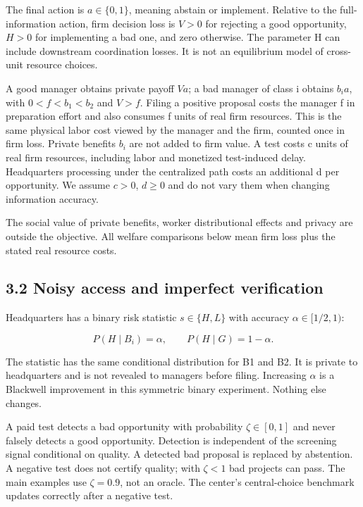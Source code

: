 \documentclass[
  11pt,
]{article}
\begin{document}
The final action is \(a\in\{0,1\}\), meaning abstain or implement.
Relative to the full-information action, firm decision loss is \(V>0\)
for rejecting a good opportunity, \(H>0\) for implementing a bad one,
and zero otherwise. The parameter H can include downstream coordination
losses. It is not an equilibrium model of cross-unit resource choices.

A good manager obtains private payoff \(Va\); a bad manager of class i
obtains \(b_i a\), with \(0<f<b_1<b_2\) and \(V>f\). Filing a positive
proposal costs the manager f in preparation effort and also consumes f
units of real firm resources. This is the same physical labor cost
viewed by the manager and the firm, counted once in firm loss. Private
benefits \(b_i\) are not added to firm value. A test costs c units of
real firm resources, including labor and monetized test-induced delay.
Headquarters processing under the centralized path costs an additional d
per opportunity. We assume \(c>0\), \(d\geq0\) and do not vary them when
changing information accuracy.

The social value of private benefits, worker distributional effects and
privacy are outside the objective. All welfare comparisons below mean
firm loss plus the stated real resource costs.

\subsection{3.2 Noisy access and imperfect
verification}\label{noisy-access-and-imperfect-verification}

Headquarters has a binary risk statistic \(s\in\{H,L\}\) with accuracy
\(\alpha\in[1/2,1)\):

\[P(H\mid B_i)=\alpha,\qquad P(H\mid G)=1-\alpha.\]

The statistic has the same conditional distribution for B1 and B2. It is
private to headquarters and is not revealed to managers before filing.
Increasing \(\alpha\) is a Blackwell improvement in this symmetric
binary experiment. Nothing else changes.

A paid test detects a bad opportunity with probability \(\zeta\in[0,1]\)
and never falsely detects a good opportunity. Detection is independent
of the screening signal conditional on quality. A detected bad proposal
is replaced by abstention. A negative test does not certify quality;
with \(\zeta<1\) bad projects can pass. The main examples use
\(\zeta=0.9\), not an oracle. The center's central-choice benchmark
updates correctly after a negative test.
\end{document}
